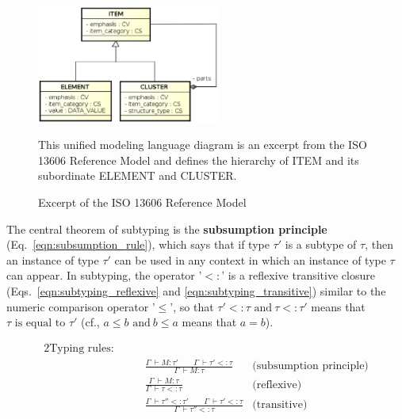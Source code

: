 \documentclass[preprint,3p,onecolumn,times,review]{elsarticle}
\begin{document}
\begin{figure}[!htbp]
  \begin{center}
    \includegraphics[width=6cm]{excerpt_reference_model.eps}  
  \end{center}
  \caption{Excerpt of the ISO 13606 Reference Model}\label{fig:excerpt_reference_model}
  This unified modeling language diagram is an excerpt from the ISO 13606 Reference Model\cite[p.10]{iso08:13606_healt_elect_part1} and defines the hierarchy of {\sf ITEM} and its subordinate {\sf ELEMENT} and {\sf CLUSTER}.
\end{figure}

The central theorem of subtyping is the {\bf subsumption principle} (Eq.~\ref{eqn:subsumption_rule}), which says that if type $\tau'$ is a subtype of $\tau$, then an instance of type $\tau'$ can be used in any context in which an instance of type $\tau$ can appear.
In subtyping, the operator '$<:$' is a reflexive transitive closure (Eqs.~\ref{eqn:subtyping_reflexive} and \ref{eqn:subtyping_transitive}) similar to the numeric comparison operator '$\leq$', so that  $\tau' <: \tau \text{ and}~ \tau <: \tau' $ means that $\tau \text{ is equal to } \tau'$ (cf., $a \leq b \text{ and}~ b \leq a $ means that $a = b$).

\begin{alignat}{2}
        \text{Typing rules:} \qquad   \nonumber\\
        & \frac{\Gamma~ \vdash M : \tau'  \qquad \Gamma~ \vdash \tau' <: \tau}
               {\Gamma~ \vdash M : \tau} & \text{(subsumption principle)}\label{eqn:subsumption_rule}\\[6pt]
        & \frac{\Gamma~ \vdash M : \tau}
               {\Gamma~ \vdash \tau <: \tau} & \label{eqn:subtyping_reflexive} \text{(reflexive)}\\[6pt]
        & \frac{\Gamma~ \vdash \tau'' <: \tau' \qquad \Gamma~ \vdash \tau' <: \tau}
               {\Gamma~ \vdash \tau'' <: \tau} & \label{eqn:subtyping_transitive} \text{(transitive)}
\end{alignat}
\end{document}
